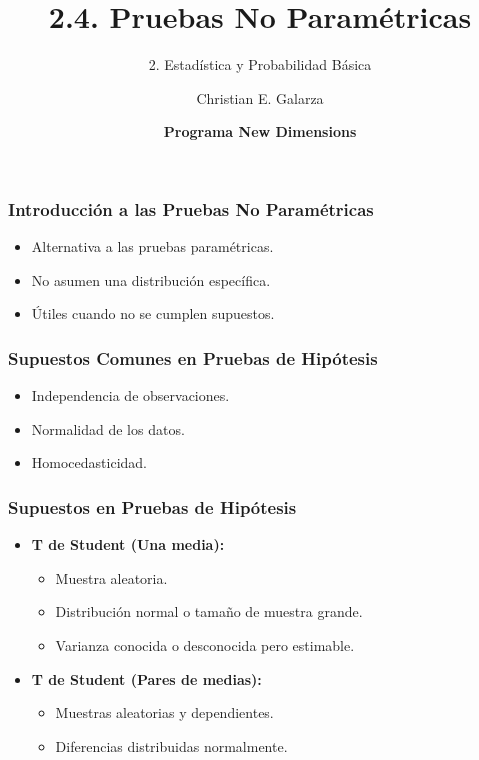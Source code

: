\documentclass[aspectratio=169]{beamer}
\title[2.4. Pruebas No Paramétricas]{\Huge 2.4. Pruebas No Paramétricas}
\subtitle{2. Estadística y Probabilidad Básica}
\author{Christian E. Galarza}
\date{\bf Programa New Dimensions}
\begin{document}
\frame{\titlepage}

\begin{frame}
\frametitle{Introducción a las Pruebas No Paramétricas}
\begin{itemize}
\item Alternativa a las pruebas paramétricas.
\item No asumen una distribución específica.
\item Útiles cuando no se cumplen supuestos.
\end{itemize}
\end{frame}

\begin{frame}
\frametitle{Supuestos Comunes en Pruebas de Hipótesis}
\begin{itemize}
\item Independencia de observaciones.
\item Normalidad de los datos.
\item Homocedasticidad.
\end{itemize}
\end{frame}


\begin{frame}
\frametitle{Supuestos en Pruebas de Hipótesis}

\begin{itemize}
    \item \textbf{T de Student (Una media):}
    \begin{itemize}
        \item Muestra aleatoria.
        \item Distribución normal o tamaño de muestra grande.
        \item Varianza conocida o desconocida pero estimable.
    \end{itemize}

\vfill

    \item \textbf{T de Student (Pares de medias):}
    \begin{itemize}
        \item Muestras aleatorias y dependientes.
        \item Diferencias distribuidas normalmente.
    \end{itemize}
        \end{itemize}


\end{frame}
\end{document}
